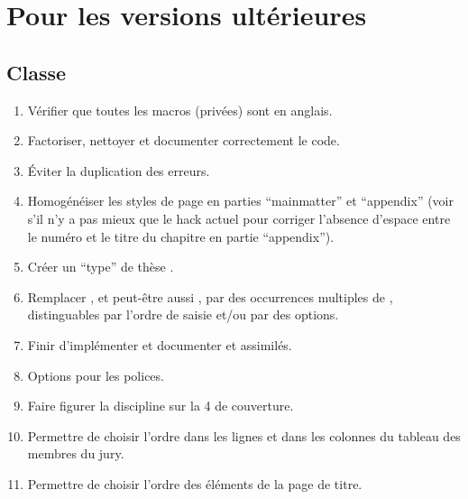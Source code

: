 \section{Pour les versions ultérieures}
\label{sec:pour-les-versions}

\subsection{Classe}
\label{sec:classe-ult}

\begin{enumerate}
\item Vérifier que toutes les macros (privées) sont en anglais.
\item Factoriser, nettoyer et documenter correctement le code.
\item Éviter la duplication des erreurs.
\item Homogénéiser les styles de page en parties \enquote{mainmatter} et
  \enquote{appendix} (voir s'il n'y a pas mieux que le hack actuel pour
  corriger l'absence d'espace entre le numéro et le titre du chapitre en partie
  \enquote{appendix}).
\item Créer un \enquote{type} de thèse .
\item Remplacer , et peut-être aussi , par des
  occurrences multiples de , distinguables par l'ordre de saisie
  et/ou par des  options.
\item Finir d'implémenter et documenter  et
  assimilés.
\item Options pour les polices.
\item Faire figurer la discipline sur la 4\ieme{} de couverture.
\item Permettre de choisir l'ordre dans les lignes et dans les colonnes du
  tableau des membres du jury.
\item Permettre de choisir l'ordre des éléments de la page de titre.

\end{enumerate}
